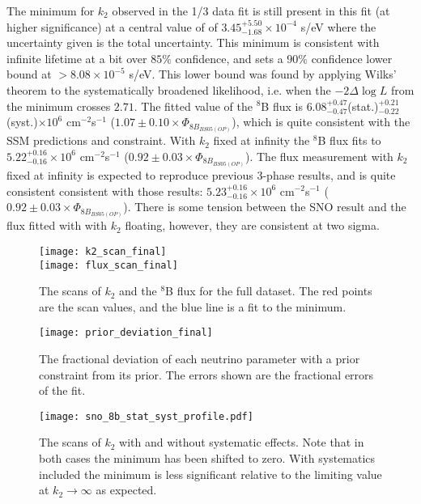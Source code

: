 The minimum for $k_2$ observed in the 1/3 data fit is still present in this fit (at higher significance) at a central value of of $3.45^{+5.50}_{-1.68}\times10^{-4}$ s/eV where the uncertainty given is the total uncertainty.
This minimum is consistent with infinite lifetime at a bit over $85\%$ confidence, and sets a $90\%$ confidence lower bound at $>8.08\times10^{-5}$ s/eV.
This lower bound was found by applying Wilks' theorem to the systematically broadened likelihood, i.e. when the $-2\Delta\log{L}$ from the minimum crosses $2.71$.
The fitted value of the $^8$B flux is $6.08^{+0.47}_{-0.47}$(stat.)$^{+0.21}_{-0.22}$(syst.)$\times10^6$ cm$^{-2}$s$^{-1}$ ($1.07\pm0.10 \times \Phi_{8B_{BS05(OP)}}$), which is quite consistent with the SSM predictions and constraint.
With $k_2$ fixed at infinity the $^8$B flux fits to $5.22^{+0.16}_{-0.16}\times10^6$ cm$^{-2}$s$^{-1}$ ($0.92\pm0.03 \times \Phi_{8B_{BS05(OP)}}$).
The flux measurement with $k_2$ fixed at infinity is expected to reproduce previous 3-phase results, and is quite consistent consistent with those results: $5.23^{+0.16}_{-0.16}\times10^6$ cm$^{-2}$s$^{-1}$ ($0.92\pm0.03 \times \Phi_{8B_{BS05(OP)}}$).
There is some tension between the SNO result and the flux fitted with with $k_2$ floating, however, they are consistent at two sigma. 

\begin{figure}
\centering
\texttt{[image: k2\_scan\_final]} \\
\vspace{12pt}
\texttt{[image: flux\_scan\_final]}
\caption{The scans of $k_2$ and the $^8$B flux for the full dataset. The red points are the scan values, and the blue line is a fit to the minimum.}
\label{fig:final_scans}
\end{figure}

\begin{figure}
\centering
\texttt{[image: prior\_deviation\_final]}
\caption{The fractional deviation of each neutrino parameter with a prior constraint from its prior. The errors shown are the fractional errors of the fit.}
\label{fig:priors_final}
\end{figure}

\begin{figure}
\centering
\texttt{[image: sno\_8b\_stat\_syst\_profile.pdf]}
\caption{The scans of $k_2$ with and without systematic effects. Note that in both cases the minimum has been shifted to zero. With systematics included the minimum is less significant relative to the limiting value at $k_2 \rightarrow \infty$ as expected.}
\label{fig:systematic_scans}
\end{figure}

